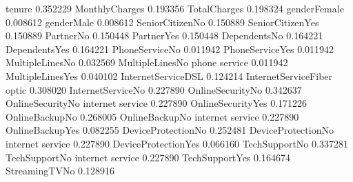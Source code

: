 \documentclass[letterpaper,10pt,english]{jupyterBook}
\begin{document}
\begin{sphinxVerbatim}[commandchars=\\\{\}]
  
\PYG{p}{[}\PYG{p}{]}
\end{sphinxVerbatim}

\begin{sphinxVerbatim}[commandchars=\\\{\}]
tenure                                    \PYGZhy{}0.352229
MonthlyCharges                             0.193356
TotalCharges                              \PYGZhy{}0.198324
gender\PYGZus{}Female                              0.008612
gender\PYGZus{}Male                               \PYGZhy{}0.008612
SeniorCitizen\PYGZus{}No                          \PYGZhy{}0.150889
SeniorCitizen\PYGZus{}Yes                          0.150889
Partner\PYGZus{}No                                 0.150448
Partner\PYGZus{}Yes                               \PYGZhy{}0.150448
Dependents\PYGZus{}No                              0.164221
Dependents\PYGZus{}Yes                            \PYGZhy{}0.164221
PhoneService\PYGZus{}No                           \PYGZhy{}0.011942
PhoneService\PYGZus{}Yes                           0.011942
MultipleLines\PYGZus{}No                          \PYGZhy{}0.032569
MultipleLines\PYGZus{}No phone service            \PYGZhy{}0.011942
MultipleLines\PYGZus{}Yes                          0.040102
InternetService\PYGZus{}DSL                       \PYGZhy{}0.124214
InternetService\PYGZus{}Fiber optic                0.308020
InternetService\PYGZus{}No                        \PYGZhy{}0.227890
OnlineSecurity\PYGZus{}No                          0.342637
OnlineSecurity\PYGZus{}No internet service        \PYGZhy{}0.227890
OnlineSecurity\PYGZus{}Yes                        \PYGZhy{}0.171226
OnlineBackup\PYGZus{}No                            0.268005
OnlineBackup\PYGZus{}No internet service          \PYGZhy{}0.227890
OnlineBackup\PYGZus{}Yes                          \PYGZhy{}0.082255
DeviceProtection\PYGZus{}No                        0.252481
DeviceProtection\PYGZus{}No internet service      \PYGZhy{}0.227890
DeviceProtection\PYGZus{}Yes                      \PYGZhy{}0.066160
TechSupport\PYGZus{}No                             0.337281
TechSupport\PYGZus{}No internet service           \PYGZhy{}0.227890
TechSupport\PYGZus{}Yes                           \PYGZhy{}0.164674
StreamingTV\PYGZus{}No                             0.128916

\end{sphinxVerbatim}
\end{document}
